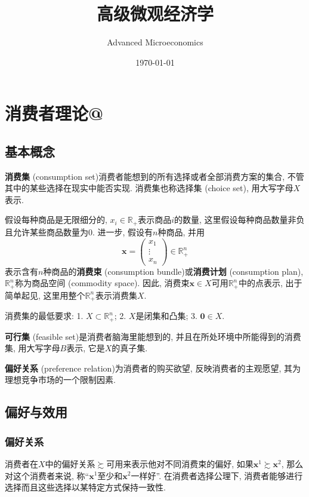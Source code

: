 \documentclass[cn, 12pt, math=mtpro2, bibstyle=apa, blue]{elegantbook}
\title{高级微观经济学}
\subtitle{Advanced Microeconomics}
\date{\today}
\makeatletter
\newcommand*{\rom}[1]{\expandafter\@slowromancap\romannumeral #1@}
\newcommand{\R}{\mathbb{R}}
\newcommand{\x}{\mathbf{x}}
\makeatother
\begin{document}
\maketitle
\frontmatter

\tableofcontents

\mainmatter
\chapter{消费者理论\rom{1}}
\section{基本概念}
\textbf{消费集} (consumption set)消费者能想到的所有选择或者全部消费方案的集合, 不管其中的某些选择在现实中能否实现. 消费集也称选择集 (choice set), 用大写字母$X$表示.

假设每种商品是无限细分的, $x_i\in\R_+$表示商品$i$的数量, 这里假设每种商品数量非负且允许某些商品数量为0. 进一步, 假设有$n$种商品, 并用
$$\x=\begin{pmatrix}
      x_1 \\
      \vdots \\
      x_n
    \end{pmatrix}\in \R^n_+$$
表示含有$n$种商品的\textbf{消费束} (consumption bundle)或\textbf{消费计划} (consumption plan), $\R^n_+$称为商品空间 (commodity space). 因此, 消费束$\x\in X$可用$\R^n_+$中的点表示, 出于简单起见, 这里用整个$\R^n_+$表示消费集$X$.

\begin{postulate}\label{pos:pos1.1}
消费集的最低要求: 1. $X\subset \R_+^n$; 2. $X$是闭集和凸集; 3. $\mathbf{0}\in X$.
\end{postulate}

\textbf{可行集} (feasible set)是消费者脑海里能想到的, 并且在所处环境中所能得到的消费集, 用大写字母$B$表示, 它是$X$的真子集.

\textbf{偏好关系} (preference relation)为消费者的购买欲望, 反映消费者的主观愿望, 其为理想竞争市场的一个限制因素.
\section{偏好与效用}
\subsection{偏好关系}
消费者在$X$中的偏好关系$\succsim$可用来表示他对不同消费束的偏好, 如果$\x^1\succsim\x^2$, 那么对这个消费者来说, 称“$\x^1$至少和$\x^2$一样好”. 在消费者选择公理下, 消费者能够进行选择而且这些选择以某特定方式保持一致性.
\end{document}
